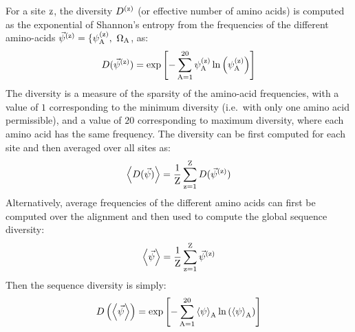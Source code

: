 For a site $\text{z}$, the diversity $D^{(\text{z})}$ (or effective number of amino acids) is computed as the exponential of Shannon's entropy from the frequencies of the different amino-acids $\Freq\siteexp = \{ \freq\siteexp_{\aminoacid},\ \SetAa$, as:
\begin{equation}
    D(\vec{\psi}^{(\text{z})}) = \exp \left[ - \sum\limits_{\text{A}=1}^{20} \psi^{(\text{z})}_{\text{A}} \ln \left( \psi^{(\text{z})}_{\text{A}} \right) \right]
    \label{eq:diversity-site-specific}
\end{equation}
The diversity is a measure of the sparsity of the amino-acid frequencies, with a value of $1$ corresponding to the minimum diversity (i.e.~with only one amino acid permissible), and a value of $20$ corresponding to maximum diversity, where each amino acid has the same frequency.
The diversity can be first computed for each site and then averaged over all sites as:
\begin{equation}
    \left\langle D(\vec{\psi}) \right\rangle = \dfrac{1}{\text{Z}}\sum\limits_{\text{z}=1}^{\text{Z}} D(\vec{\psi}^{(\text{z})})
    \label{eq:diversity-site-specific-avg}
\end{equation}
Alternatively, average frequencies of the different amino acids can first be computed over the alignment and then used to compute the global sequence diversity:
\begin{equation}
    \left\langle \vec{\psi} \right\rangle = \dfrac{1}{\text{Z}}\sum\limits_{\text{z}=1}^{\text{Z}} \vec{\psi}^{(\text{z})}
    \label{eq:profile-gene-wise}
\end{equation}
Then the sequence diversity is simply:
\begin{equation}
    D \left(  \left\langle \vec{\psi} \right\rangle \right) = \exp \left[ - \sum\limits_{\text{A}=1}^{20} \left\langle \psi \right\rangle_{\text{A}} \ln \left( \left\langle \psi \right\rangle_{\text{A}} \right) \right]
    \label{eq:diversity-gene-wise}
\end{equation}

